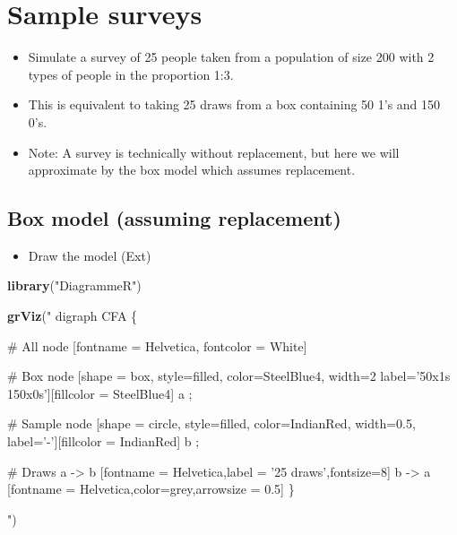\documentclass[]{article}
\newenvironment{Shaded}{\begin{snugshade}}{\end{snugshade}}
\newcommand{\KeywordTok}[1]{\textcolor[rgb]{0.13,0.29,0.53}{\textbf{#1}}}
\newcommand{\NormalTok}[1]{#1}
\newcommand{\StringTok}[1]{\textcolor[rgb]{0.31,0.60,0.02}{#1}}
\providecommand{\tightlist}{%
  \setlength{\itemsep}{0pt}\setlength{\parskip}{0pt}}
\begin{document}
\hypertarget{samplesurveys}{%
\section{Sample surveys}\label{samplesurveys}}

\begin{itemize}
\item
  Simulate a survey of 25 people taken from a population of size 200 with 2 types of people in the proportion 1:3.
\item
  This is equivalent to taking 25 draws from a box containing 50 1's and 150 0's.
\item
  Note: A survey is technically without replacement, but here we will approximate by the box model which assumes replacement.
\end{itemize}

\hypertarget{box-model-assuming-replacement}{%
\subsection{Box model (assuming replacement)}\label{box-model-assuming-replacement}}

\begin{itemize}
\tightlist
\item
  Draw the model (Ext)
\end{itemize}

\begin{Shaded}
\begin{Highlighting}[]
\KeywordTok{library}\NormalTok{(}\StringTok{"DiagrammeR"}\NormalTok{)}

\KeywordTok{grViz}\NormalTok{(}\StringTok{" }
\StringTok{  digraph CFA \{}

\StringTok{  # All}
\StringTok{  node [fontname = Helvetica, fontcolor = White]}

\StringTok{    # Box}
\StringTok{    node [shape = box, style=filled, color=SteelBlue4, width=2 label='50x1s  150x0s'][fillcolor = SteelBlue4]}
\StringTok{    a ; }

\StringTok{    # Sample}
\StringTok{    node [shape = circle, style=filled, color=IndianRed, width=0.5, label='-'][fillcolor = IndianRed]}
\StringTok{    b ; }

\StringTok{    # Draws}
\StringTok{    a -> b [fontname = Helvetica,label = '25 draws',fontsize=8]}
\StringTok{    b -> a  [fontname = Helvetica,color=grey,arrowsize = 0.5]}
\StringTok{  \}}

\StringTok{"}\NormalTok{)}
\end{Highlighting}
\end{Shaded}
\end{document}
